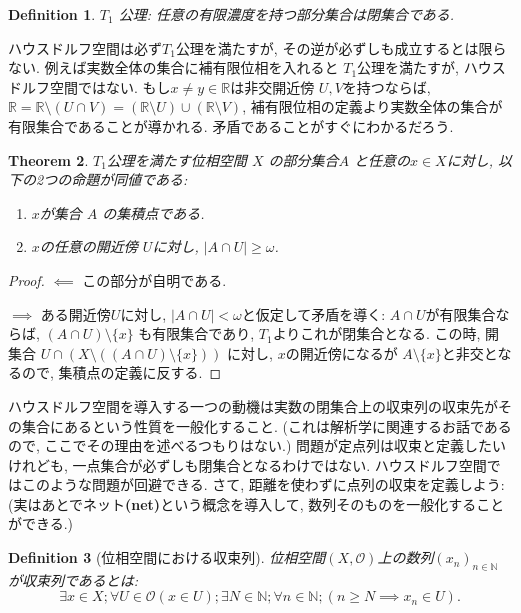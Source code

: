 \documentclass[lualatex]{ltjsbook}
\newtheorem{theorem}{Theorem}[chapter]
\newtheorem{definition}[theorem]{Definition}
\theoremstyle{remark}
\theoremstyle{plain}
\begin{document}
\begin{definition}
	$T_1$ 公理: 任意の有限濃度を持つ部分集合は閉集合である.
\end{definition}

ハウスドルフ空間は必ず$T_1$公理を満たすが,  その逆が必ずしも成立するとは限らない.
例えば実数全体の集合に補有限位相を入れると $T_1$公理を満たすが,  ハウスドルフ空間ではない. 
もし$x \neq y \in \mathbb{R}$は非交開近傍 $U, V$を持つならば, 
$\mathbb{R} = \mathbb{R} \setminus \left( U \cap V \right) =\left( \mathbb{R} \setminus U \right) \cup \left( \mathbb{R} \setminus V \right) $,  補有限位相の定義より実数全体の集合が有限集合であることが導かれる.
矛盾であることがすぐにわかるだろう.

\begin{theorem}
	\label{thm: limit point}
	$T_1$公理を満たす位相空間 $X$ の部分集合$A$ と任意の$x \in X$に対し,  以下の2つの命題が同値である: 
	\begin{enumerate}
		\item $x$が集合 $A$ の集積点である.
		\item $x$の任意の開近傍 $U$に対し,   $|A\cap U| \ge \omega$.
	\end{enumerate}
\end{theorem}

\begin{proof}
	$\impliedby$ この部分が自明である.

	$\implies$ ある開近傍$U$に対し,   $ |  A \cap U | < \omega $と仮定して矛盾を導く: 
	$A\cap U$が有限集合ならば,   $\left( A \cap U \right) \setminus \{x\} $ も有限集合であり,  $T_1$よりこれが閉集合となる. 
	この時,  開集合 $U\cap \left( X \setminus \left( \left( A \cap U \right)  \setminus \{ x\} \right) \right) $ に対し,  $x $の開近傍になるが $A \setminus \{x\} $と非交となるので,  集積点の定義に反する.
\end{proof}

ハウスドルフ空間を導入する一つの動機は実数の閉集合上の収束列の収束先がその集合にあるという性質を一般化すること. 
(これは解析学に関連するお話であるので,  ここでその理由を述べるつもりはない.)
問題が定点列は収束と定義したいけれども,  一点集合が必ずしも閉集合となるわけではない.
ハウスドルフ空間ではこのような問題が回避できる.
さて,  距離を使わずに点列の収束を定義しよう:(実はあとでネット\textbf{(net)}という概念を導入して, 数列そのものを一般化することができる.)

 \begin{definition}[位相空間における収束列]
	位相空間$\left( X , \mathcal{O} \right) $上の数列$\left( x_n \right) _{n \in \mathbb{N}}$が収束列であるとは:
	\[
	\exists x \in X ; \forall U \in \mathcal{O}\left( x \in U \right) ; \exists N \in \mathbb{N}; \forall n \in \mathbb{N}; \left( n \ge N \implies x_n \in U \right) 
	.\] 
\end{definition}
\end{document}
